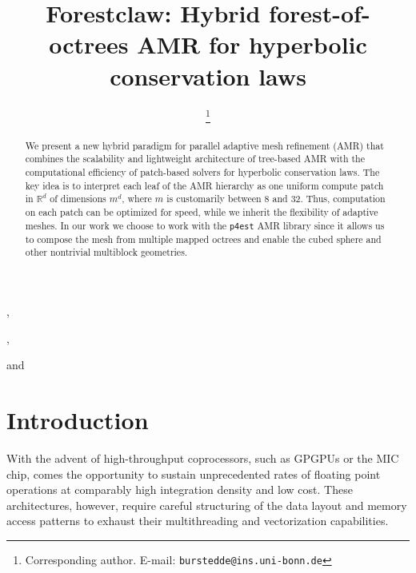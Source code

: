 \documentclass{IOS-Book-Article}     %
\newcommand{\sR}{\mathbb{R}}
\newcommand{\forestclaw}{Forestclaw\xspace}
\newcommand{\pforest}{\texttt{p4est}\xspace}
\begin{document}
\begin{frontmatter}          %
%
\title{\forestclaw:
        Hybrid forest-of-octrees AMR for hyperbolic conservation laws}
\runningtitle{\forestclaw}

%
\author[A]{ %
\thanks{Corresponding author.  E-mail: \texttt{burstedde@ins.uni-bonn.de}}},
\author[B]{ },
\author[C]{ } and
\author[C]{ }
\address[A]{Institut f\"ur Numerische Simulation, Universit\"at Bonn, Germany}
\address[B]{Boise State University, Idaho, USA}
\address[C]{Institute for Computational Engineering and Sciences,\\
The University of Texas at Austin, USA}

\begin{abstract}
%
We present a new hybrid paradigm for parallel adaptive mesh refinement (AMR)
that combines the scalability and lightweight architecture of tree-based AMR
with the computational efficiency of patch-based solvers for hyperbolic
conservation laws.  The key idea is to interpret each leaf of the AMR hierarchy
as one uniform compute patch in $\sR^d$ of dimensions $m^d$, where $m$ is
customarily between 8 and 32.  Thus, computation on each patch can be optimized
for speed, while we inherit the flexibility of adaptive meshes.  In our work we
choose to work with the \pforest AMR library since it allows us to compose the mesh
from multiple mapped octrees and enable the cubed sphere and other
nontrivial multiblock geometries.
%
\end{abstract}


\end{frontmatter}


\section{Introduction}

With the advent of high-throughput coprocessors, such as GPGPUs or the MIC
chip, comes the opportunity to sustain unprecedented rates of floating point
operations at comparably high integration density and low cost.  These
architectures, however, require careful structuring of the data layout and
memory access patterns to exhaust their multithreading and vectorization
capabilities.
\end{document}
